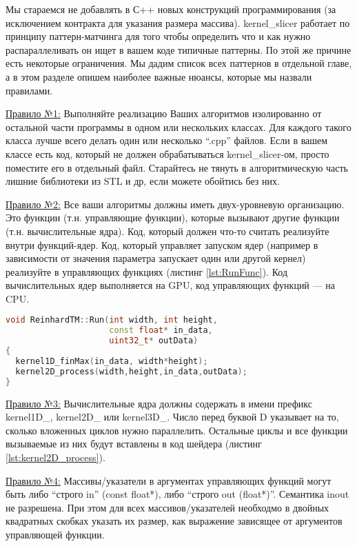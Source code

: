 \documentclass[11pt,fleqn,english,russian]{report} %
\begin{document}
Мы стараемся не добавлять в С++ новых конструкций программирования (за исключением контракта для указания размера массива). kernel\_slicer работает по принципу паттерн-матчинга для того чтобы определить что и как нужно распараллеливать он ищет в вашем коде типичные паттерны. По этой же причине есть некоторые ограничения. Мы дадим список всех паттернов в отдельной главе, а в этом разделе опишем наиболее важные нюансы, которые мы назвали правилами.

\underline{Правило №1:} Выполняйте реализацию Ваших алгоритмов изолированно от остальной части программы в одном или нескольких классах. Для каждого такого класса лучше всего делать один или несколько ``.cpp'' файлов. Если в вашем классе есть код, который не должен обрабатываться kernel\_slicer-ом, просто поместите его в отдельный файл. Старайтесь не тянуть в алгоритмическую часть лишние библиотеки из STL и др, если можете обойтись без них.

\underline{Правило №2:} Все ваши алгоритмы должны иметь двух-уровневую организацию. Это функции (т.н. управляющие функции), которые вызывают другие функции (т.н. вычислительные ядра). Код, который должен что-то считать реализуйте внутри функций-ядер. Код, который управляет запуском ядер (например в зависимости от значения параметра запускает один или другой кернел) реализуйте в управляющих функциях (листинг \ref{lst:RunFunc}). Код вычислительных ядер выполняется на GPU, код управляющих функций --- на CPU.

\begin{lstlisting}[language=C++, 
	               caption=реализация управляющей функции вызывающей вычислительные ядра, 
	               label=lst:RunFunc]	
void ReinhardTM::Run(int width, int height, 
                     const float* in_data, 
                     uint32_t* outData)
{
  kernel1D_finMax(in_data, width*height);
  kernel2D_process(width,height,in_data,outData);
}
\end{lstlisting}

\underline{Правило №3:} Вычислительные ядра должны содержать в имени префикс kernel1D\_, kernel2D\_ или kernel3D\_. Число перед буквой D указывает на то, сколько вложенных циклов нужно параллелить. Остальные циклы и все функции вызываемые из них будут вставлены в код шейдера (листинг \ref{lst:kernel2D_process}). 

\underline{Правило №4:} Массивы/указатели в аргументах управляющих функций могут быть либо ``строго in'' (const float*), либо ``строго out (float*)''. Семантика inout не разрешена. При этом для всех массивов/указателей необходмо в двойных квадратных скобках указать их размер, как выражение зависящее от аргументов управляющей функции.  
\end{document}
